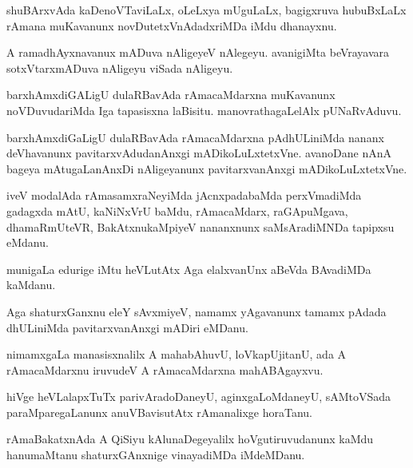 \documentclass{article}
\begin{document}
\begin{mn}%
shuBArxvAda kaDenoVTaviLaLx, oLeLxya mUguLaLx, bagigxruva hubuBxLaLx rAmana muKavanunx 
novDutetxVnAdadxriMDa iMdu dhanayxnu.
\end{mn}

\begin{mn}%
A ramadhAyxnavanux mADuva nAligeyeV nAlegeyu. avanigiMta beVrayavara sotxVtarxmADuva 
nAligeyu viSada nAligeyu.
\end{mn}

\begin{mn}%
barxhAmxdiGALigU dulaRBavAda rAmacaMdarxna muKavanunx noVDuvudariMda Iga tapasisxna 
laBisitu. manovrathagaLelAlx pUNaRvAduvu.
\end{mn}

\begin{mn}%
barxhAmxdiGaLigU dulaRBavAda rAmacaMdarxna pAdhULiniMda nananx deVhavanunx 
pavitarxvAdudanAnxgi mADikoLuLxtetxVne. avanoDane nAnA bageya mAtugaLanAnxDi nAligeyanunx 
pavitarxvanAnxgi mADikoLuLxtetxVne.
\end{mn}

\begin{mn}%
iveV modalAda rAmasamxraNeyiMda jAcnxpadabaMda perxVmadiMda gadagxda mAtU, kaNiNxVrU 
baMdu, rAmacaMdarx, raGApuMgava, dhamaRmUteVR, BakAtxnukaMpiyeV nananxnunx saMsAradiMNDa 
tapipxsu eMdanu.
\end{mn}

\begin{mn}%
munigaLa edurige iMtu heVLutAtx Aga elalxvanUnx aBeVda BAvadiMDa kaMdanu.
\end{mn}

\begin{mn}%
Aga shaturxGanxnu eleY sAvxmiyeV, namamx yAgavanunx tamamx pAdada dhULiniMda 
pavitarxvanAnxgi mADiri eMDanu.
\end{mn}

\begin{mn}%
nimamxgaLa manasisxnalilx A mahabAhuvU, loVkapUjitanU, ada A rAmacaMdarxnu iruvudeV A 
rAmacaMdarxna mahABAgayxvu.
\end{mn}

\begin{mn}%
hiVge heVLalapxTuTx parivAradoDaneyU, aginxgaLoMdaneyU, sAMtoVSada paraMparegaLanunx 
anuVBavisutAtx rAmanalixge horaTanu.
\end{mn}

\begin{mn}%
rAmaBakatxnAda A QiSiyu kAlunaDegeyalilx hoVgutiruvudanunx kaMdu hanumaMtanu 
shaturxGAnxnige vinayadiMDa iMdeMDanu.
\end{mn}
\end{document}
